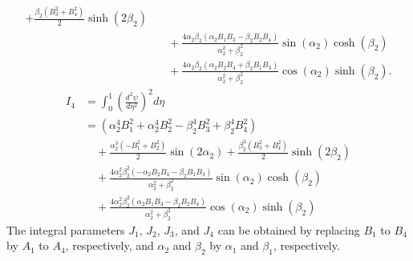 \documentclass[preprint,12pt]{elsarticle}
\begin{document}
\begin{appendices}
\begin{equation}
\begin{aligned}
		 + \frac{\beta_2 (B_3^2 + B_4^2)}{2} \sinh(2\beta_2) \\
		&\quad + \frac{4 \alpha_2 \beta_2 (\alpha_2 B_1 B_3 - \beta_2 B_2 B_4)}{\alpha_2^2 + \beta_2^2} \sin(\alpha_2) \cosh(\beta_2) \\
		&\quad + \frac{4 \alpha_2 \beta_2 (\alpha_2 B_2 B_4 + \beta_2 B_1 B_3)}{\alpha_2^2 + \beta_2^2} \cos(\alpha_2) \sinh(\beta_2).
	\end{aligned}
\end{equation}
%
\begin{equation}\label{eq:inte_dphi4}
	\begin{split}
		I_4 &= \int_{0}^{1} \left( \frac{d^2 \psi}{d \eta^2} \right)^2 d \eta \\
		&= \left( \alpha_2^4 B_1^2 + \alpha_2^4 B_2^2 - \beta_2^4 B_3^2 + \beta_2^4 B_4^2 \right) \\
		&\quad + \frac{\alpha_2^3 (-B_1^2 + B_2^2)}{2} \sin(2 \alpha_2)
		+ \frac{\beta_2^3 (B_3^2 + B_4^2)}{2} \sinh(2 \beta_2) \\
		&\quad + \frac{4 \alpha_2^2 \beta_2^2 (-\alpha_2 B_2 B_4 - \beta_2 B_1 B_3)}{\alpha_2^2 + \beta_2^2} \sin(\alpha_2) \cosh(\beta_2) \\
		&\quad + \frac{4 \alpha_2^2 \beta_2^2 (\alpha_2 B_1 B_3 - \beta_2 B_2 B_4)}{\alpha_2^2 + \beta_2^2} \cos(\alpha_2) \sinh(\beta_2)
	\end{split}
\end{equation}
%
The integral parameters $J_1$, $J_2$, $J_3$, and $J_4$ can be obtained by replacing $B_1$ to $B_4$ by $ A_1 $ to $A_4$, respectively, and $\alpha_2$ and $\beta_2$ by $\alpha_1$ and $\beta_1$, respectively.

\end{appendices}
\FloatBarrier


	
\end{document}
